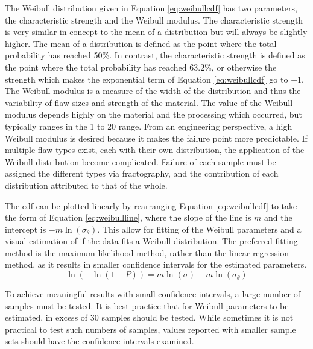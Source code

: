     The Weibull distribution given in Equation \ref{eq:weibullcdf} has two parameters, the characteristic strength and the Weibull modulus.
    The characteristic strength is very similar in concept to the mean of a distribution but will always be slightly higher.
    The mean of a distribution is defined as the point where the total probability has reached 50\%.
    In contrast, the characteristic strength is defined as the point where the total probability has reached 63.2\%, or otherwise the strength which makes the exponential term of Equation \ref{eq:weibullcdf} go to $-1$.
    The Weibull modulus is a measure of the width of the distribution and thus the variability of flaw sizes and strength of the material.
    The value of the Weibull modulus depends highly on the material and the processing which occurred, but typically ranges in the 1 to 20 range.
    From an engineering perspective, a high Weibull modulus is desired because it makes the failure point more predictable.
    If multiple flaw types exist, each with their own distribution, the application of the Weibull distribution become complicated.
    Failure of each sample must be assigned the different types via fractography, and the contribution of each distribution attributed to that of the whole.

    The \gls{cdf} can be plotted linearly by rearranging Equation \ref{eq:weibullcdf} to take the form of Equation \ref{eq:weibullline}, where the slope of the line is $m$ and the intercept is $-m\ln(\sigma_\theta)$.
    This allow for fitting of the Weibull parameters and a visual estimation of if the data fits a Weibull distribution.
    The preferred fitting method is the maximum likelihood method, rather than the linear regression method, as it results in smaller confidence intervals for the estimated parameters.
    \begin{equation}
        \label{eq:weibullline}
        \ln(-\ln(1-P))=m \ln(\sigma) - m\ln(\sigma_\theta)
    \end{equation}

    To achieve meaningful results with small confidence intervals, a large number of samples must be tested.
    It is best practice that for Weibull parameters to be estimated, in excess of 30 samples should be tested.
    While sometimes it is not practical to test such numbers of samples, values reported with smaller sample sets should have the confidence intervals examined.

